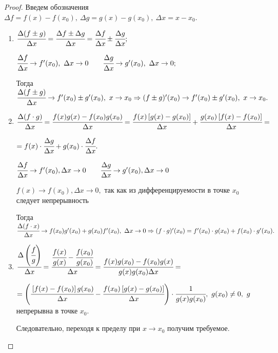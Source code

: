\begin{proof}
    Введем обозначения $\Delta f = f (x) - f(x_{0}),\  \Delta g = g(x) - g(x_{0}),\  \Delta x = x - x_{0}$.
    \begin{enumerate}
        \item $\cfrac{\Delta(f \pm g)}{\Delta x} = \cfrac{\Delta f \pm \Delta g}{\Delta x} = \cfrac{\Delta f}{\Delta x} \pm \cfrac{\Delta g}{\Delta x};$
        
        $\cfrac{\Delta f}{\Delta x} \to f'(x_{0}),\  \Delta x \to 0 \quad \quad \cfrac{\Delta g}{\Delta x} \to g'(x_{0}),\  \Delta x \to 0;$

        Тогда $\cfrac{\Delta(f \pm g)}{\Delta x} \to f'(x_{0}) \pm g'(x_{0}), \ x \to x_{0} \Rightarrow (f \pm g)'(x_{0}) \to f'(x_{0}) \pm g'(x_{0}),\  x \to x_{0}.$
        
        \item $\cfrac{\Delta(f\cdot g)}{\Delta x} = \cfrac{f(x) g(x) - f(x_{0}) g(x_{0})}{\Delta x} = \cfrac{f(x) \left[  g(x) - g(x_{0}) \right]}{\Delta x} + \cfrac{g(x_{0}) \left[ f(x) - f(x_{0})\right]}{\Delta x} =$

        $= f(x) \cdot \cfrac{\Delta g}{\Delta x} + g(x_{0}) \cdot \cfrac{\Delta f}{\Delta x}.$

        $\cfrac{\Delta f}{\Delta x} \to f'(x_{0}), \Delta x \to 0 \quad \quad \cfrac{\Delta g}{\Delta x} \to g'(x_{0}), \Delta x \to 0$
        
        $f(x) \to f(x_{0}), \Delta x\to 0,$ так как из дифференцируемости в точке $x_{0}$ следует непрерывность

        Тогда $\cfrac{\Delta (f\cdot x)}{\Delta x} \to f(x_{0}) g'(x_{0}) + g(x_{0})f'(x_{0}),\  \Delta x \to 0 \Rightarrow (f \cdot g)'(x_{0}) = f'(x_{0}) \cdot g({x_{0}}) + f(x_{0}) \cdot g'({x_{0}}).$
        
        \item $\cfrac{\Delta \left(\cfrac{f}{g} \right)}{\Delta x} = \cfrac{\cfrac{f(x)}{g(x)} - \cfrac{f(x_{0})}{g(x_{0})}}{\Delta x} = \cfrac{f(x)g(x_{0}) - f(x_{0})g(x)}{g(x) g(x_{0}) \Delta x}= $

        $=\left(\cfrac{\left[f(x) - f(x_{0})\right] g(x_{0})}{\Delta x} - \cfrac{f(x_{0})\left[g(x) - g(x_{0})\right]}{\Delta x} \right) \cdot \cfrac{1}{g(x) g(x_{0})}, \ g(x_{0}) \neq 0, \  g$ непрерывна в точке $x_{0}.$
        
        Следовательно, переходя к пределу  при $x\to x_{0}$ получим требуемое. 
    \end{enumerate}
\end{proof}

